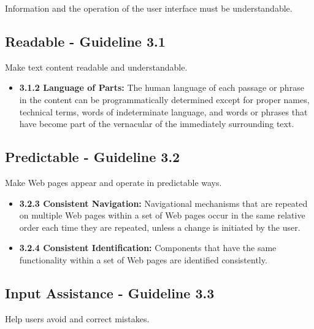 \documentclass[
  letterpaper,
  DIV=11,
  numbers=noendperiod]{scrartcl}
\providecommand{\tightlist}{%
  \setlength{\itemsep}{0pt}\setlength{\parskip}{0pt}}\usepackage{longtable,booktabs,array}
\begin{document}
Information and the operation of the user interface must be
understandable.

\subsection{Readable - Guideline 3.1}\label{readable---guideline-3.1}

Make text content readable and understandable.

\begin{itemize}
\tightlist
\item
  \textbf{3.1.2 Language of Parts:} The human language of each passage
  or phrase in the content can be programmatically determined except for
  proper names, technical terms, words of indeterminate language, and
  words or phrases that have become part of the vernacular of the
  immediately surrounding text.
\end{itemize}

\subsection{Predictable - Guideline
3.2}\label{predictable---guideline-3.2}

Make Web pages appear and operate in predictable ways.

\begin{itemize}
\tightlist
\item
  \textbf{3.2.3 Consistent Navigation:} Navigational mechanisms that are
  repeated on multiple Web pages within a set of Web pages occur in the
  same relative order each time they are repeated, unless a change is
  initiated by the user.
\item
  \textbf{3.2.4 Consistent Identification:} Components that have the
  same functionality within a set of Web pages are identified
  consistently.
\end{itemize}

\subsection{Input Assistance - Guideline
3.3}\label{input-assistance---guideline-3.3}

Help users avoid and correct mistakes.
\end{document}
